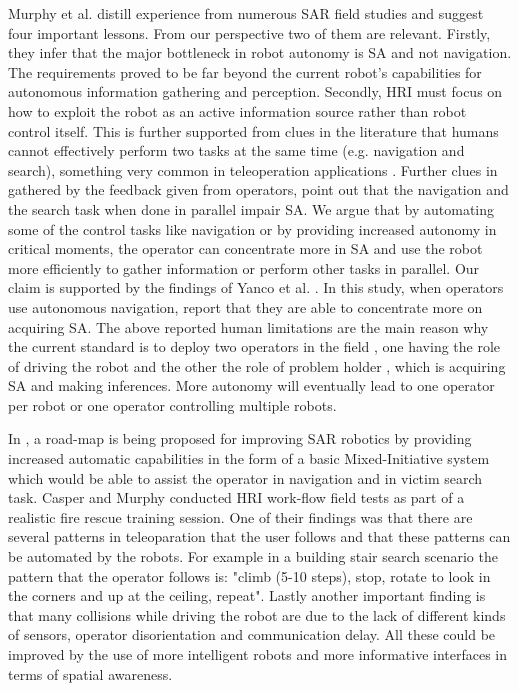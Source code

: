 \documentclass[a4paper,12pt,oneside,openright]{bhamthesis}
\begin{document}
Murphy et al. \citep{Murphy2005a} distill experience from numerous SAR field studies and suggest four important lessons. From our perspective two of them are relevant. Firstly, they infer that the major bottleneck in robot autonomy is SA and not navigation. The requirements proved to be far beyond the current robot's capabilities for autonomous information gathering and perception. Secondly, HRI must focus on how to exploit the robot as an active information source rather than robot control itself.  This is further supported from clues in the literature that humans cannot effectively perform two tasks at the same time (e.g. navigation and search), something very common in teleoperation applications \citep{Casper2002}. Further clues in \citep{Yanco2006} gathered by the feedback given from operators, point out that the navigation and the search task when done in parallel impair SA. We argue that by automating some of the control tasks like navigation or by providing increased autonomy in critical moments, the operator can concentrate more in SA and use the robot more efficiently to gather information or perform other tasks in parallel. Our claim is supported by the findings of Yanco et al. \citep{Yanco_HRI_SA_04}. In this study, when operators use autonomous navigation, report that they are able to concentrate more on acquiring SA. The above reported human limitations are the main reason why the current standard is to deploy two operators in the field \citep{Burke2004b}, one having the role of driving the robot and the other the role of problem holder \citep{Murphy2004}, which is acquiring SA and making inferences. More autonomy will eventually lead to one operator per robot or one operator controlling multiple robots.

In \citep{Murphy2002}, a road-map is being proposed for improving SAR robotics by providing  increased automatic capabilities in the form of a basic Mixed-Initiative system which would be able to assist the operator in navigation and in victim search task. Casper and Murphy \citep{Casper2002} conducted HRI work-flow field tests as part of a realistic fire rescue training session. One of their findings was that there are several patterns in teleoparation that the user follows and that these patterns can be automated by the robots. For example in a building stair search scenario the pattern that the operator follows is: "climb (5-10 steps), stop, rotate to look in the corners and up at the ceiling, repeat". Lastly another important finding is that many collisions while driving the robot are due to the lack of different kinds of sensors, operator disorientation and communication delay. All these could be improved by the use of more intelligent robots and more informative interfaces in terms of spatial awareness.
\end{document}
